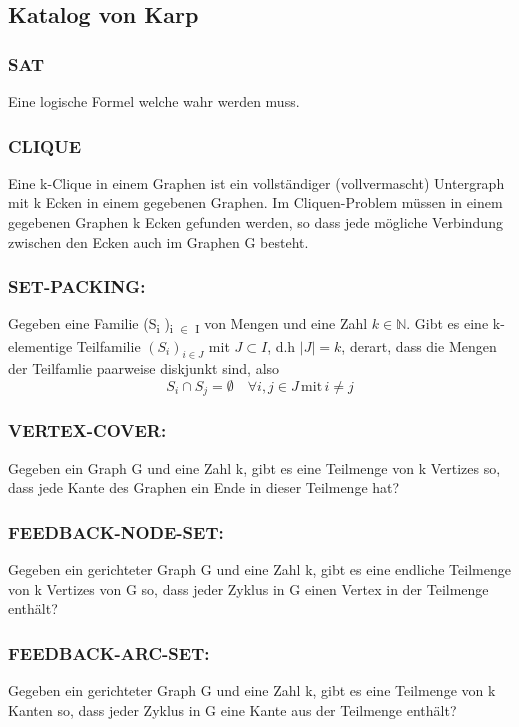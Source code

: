 \documentclass[11pt,twoside,landscape]{article}
\begin{document}
\begin{multicols}{2}
\section{Katalog von Karp}
\label{sec:org73eb9be}
\subsubsection{SAT}
\label{sec:org3b45f99}
Eine logische Formel welche wahr werden muss.
\subsubsection{CLIQUE}
\label{sec:org8b74f47}
Eine k-Clique in einem Graphen ist ein vollständiger (vollvermascht) Untergraph mit k Ecken in einem gegebenen Graphen. Im Cliquen-Problem müssen in einem gegebenen Graphen k Ecken gefunden werden, so dass jede mögliche Verbindung zwischen den Ecken auch im Graphen G besteht.
\subsubsection{SET-PACKING:}
\label{sec:orgba120a1}
Gegeben eine Familie (S\textsubscript{i} )\textsubscript{i \(\in\) I} von Mengen und eine Zahl \(k \in \mathbb{N}\). Gibt es eine k-elementige Teilfamilie \((S_i)_{i \in J}\) mit \(J \subset I\), d.h \(|J| = k\), derart, dass die Mengen der Teilfamlie paarweise diskjunkt sind, also
$$
S_i \cap S_j = \emptyset \quad \forall i, j \in J \, \text{mit} \, i \neq j
$$

\subsubsection{VERTEX-COVER:}
\label{sec:orgc7a28dd}
Gegeben ein Graph G und eine Zahl k, gibt es eine Teilmenge von k Vertizes so, dass jede Kante des Graphen ein Ende in dieser Teilmenge hat?

\subsubsection{FEEDBACK-NODE-SET:}
\label{sec:org2460272}
Gegeben ein gerichteter Graph G und eine Zahl k, gibt es eine endliche Teilmenge von k Vertizes von G so, dass jeder Zyklus in G einen Vertex in der Teilmenge enthält?

\subsubsection{FEEDBACK-ARC-SET:}
\label{sec:org6930787}
Gegeben ein gerichteter Graph G und eine Zahl k, gibt es eine Teilmenge von k Kanten so, dass jeder Zyklus in G eine Kante aus der Teilmenge enthält?


\end{multicols}
\end{document}
